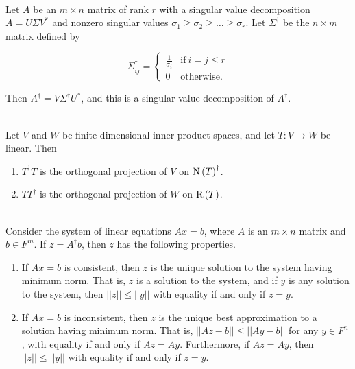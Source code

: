 \begin{theorem}
	\hfill\\
	Let $A$ be an $m \times n$ matrix of rank $r$ with a singular value decomposition $A = U\Sigma V^*$ and nonzero singular values $\sigma_1 \geq \sigma_2 \geq \dots \geq \sigma_r$. Let $\Sigma^\dagger$ be the $n \times m$ matrix defined by

	\[\Sigma_{ij}^\dagger = \begin{cases}
			\frac{1}{\sigma_i} & \text{if}\ i = j \leq r \\
			0                  & \text{otherwise.}
		\end{cases}\]

	Then $A^\dagger = V\Sigma^\dagger U^*$, and this is a singular value decomposition of $A^\dagger$.
\end{theorem}

\begin{lemma}
	\hfill\\
	Let $V$ and $W$ be finite-dimensional inner product spaces, and let $T: V \to W$ be linear. Then

	\begin{enumerate}
		\item $T^\dagger T$ is the orthogonal projection of $V$ on $\text{N}\left(T\right)^\dagger$.
		\item $TT^\dagger$ is the orthogonal projection of $W$ on $\text{R}\left(T\right)$.
	\end{enumerate}
\end{lemma}

\begin{theorem}
	\hfill\\
	Consider the system of linear equations $Ax = b$, where $A$ is an $m \times n$ matrix and $b \in F^m$. If $z = A^\dagger b$, then $z$ has the following properties.

	\begin{enumerate}
		\item If $Ax = b$ is consistent, then $z$ is the unique solution to the system having minimum norm. That is, $z$ is a solution to the system, and if $y$ is any solution to the system, then $||z|| \leq ||y||$ with equality if and only if $z = y$.
		\item If $Ax = b$ is inconsistent, then $z$ is the unique best approximation to a solution having minimum norm. That is, $||Az - b|| \leq ||Ay - b||$ for any $y \in F^n$, with equality if and only if $Az = Ay$. Furthermore, if $Az = Ay$, then $||z|| \leq ||y||$ with equality if and only if $z = y$.
	\end{enumerate}
\end{theorem}

